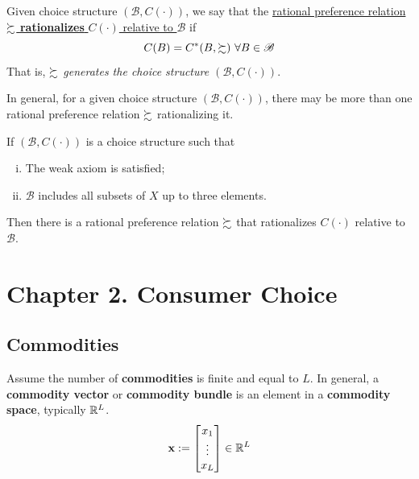 \documentclass{report}
\begin{document}
		\begin{definition}[1.D.1]
			Given choice structure $(\mathscr{B}, C(\cdot))$, we say that the \ul{rational preference relation $\succsim$ \textbf{rationalizes} $C(\cdot)$ relative to $\mathscr{B}$} if
			\begin{equation}
				C(B) = C^*(B, \succsim)\ \forall B \in \mathscr{B}
			\end{equation}
			That is, \emph{$\succsim$ generates the choice structure $(\mathscr{B}, C(\cdot))$}.
		\end{definition}
		
		\begin{remark}
			In general, for a given choice structure $(\mathscr{B}, C(\cdot))$, there may be more than one rational preference relation $\succsim$ rationalizing it.
		\end{remark}
		
		\begin{proposition}
			If $(\mathscr{B}, C(\cdot))$ is a choice structure such that
			\begin{enumerate}[(i)]
				\item The weak axiom is satisfied;
				\item $\mathscr{B}$ includes all subsets of $X$ up to three elements.
			\end{enumerate}
			Then there is a rational preference relation $\succsim$ that rationalizes $C(\cdot)$ relative to $\mathscr{B}$.
		\end{proposition}
	
	\section{Chapter 2. Consumer Choice}
		\subsection{Commodities}
			\begin{definition}
				Assume the number of \textbf{commodities} is finite and equal to $L$. In general, a \textbf{commodity vector} or \textbf{commodity bundle} is an element in a \textbf{commodity space}, typically $\mathbb{R}^L$.
				\begin{equation}
					\textbf{x} := \begin{bmatrix}
						x_1 \\ \vdots \\ x_L
					\end{bmatrix} \in \mathbb{R}^L
				\end{equation}
 			\end{definition}
 			
\end{document}
